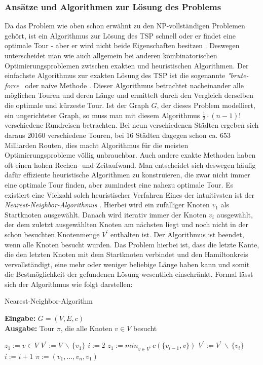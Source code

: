 \documentclass[doktyp=barbeit, sprache=german]{TUBAFarbeiten}
\begin{document}
\subsubsection{Ansätze und Algorithmen zur Lösung des Problems}
Da das Problem wie oben schon erwähnt zu den NP-vollständigen Problemen gehört, ist ein Algorithmus zur Lösung des TSP schnell oder er findet eine optimale Tour - aber er wird nicht beide Eigenschaften besitzen \cite{TSP}. Deswegen unterscheidet man wie auch allgemein bei anderen kombinatorischen Optimierungsproblemen zwischen exakten und heuristischen Algorithmen.
Der einfachste Algorithmus zur exakten Lösung des TSP ist die sogenannte \textit{"brute-force\grqq} \, oder naive Methode \cite{TaschenbuchAlgorithmen}. Dieser Algorithmus betrachtet nacheinander alle möglichen Touren und deren Länge und ermittelt durch den Vergleich derselben die optimale und kürzeste Tour. 
Ist der Graph \(G\), der dieses Problem modelliert, ein ungerichteter Graph, so muss man mit diesem Algorithmus \(\frac{1}{2} \cdot (n - 1)!\) verschiedene Rundreisen betrachten. Bei neun verschiedenen Städten ergeben sich daraus 20160 verschiedene Touren, bei 16 Städten dagegen schon ca. 653 Milliarden Routen, dies macht Algorithmus für die meisten Optimierungsprobleme völlig unbrauchbar. Auch andere exakte Methoden haben oft einen hohen Rechen- und Zeitaufwand. Man entscheidet sich deswegen häufig dafür effiziente heuristische Algorithmen zu konstruieren, die zwar nicht immer eine optimale Tour finden, aber zumindest eine nahezu optimale Tour. Es existiert eine Vielzahl solch heuristischer Verfahren Eines der intuitivsten ist der \textit{Nearest-Neighbor-Algorithmus} \cite{Lotz2014}. Hierbei wird ein zufälliger Knoten $v_1$ als Startknoten ausgewählt. Danach wird iterativ immer der Knoten $v_i$ ausgewählt, der dem zuletzt ausgewählten Knoten am nächsten liegt und noch nicht in der schon besuchten Knotenmenge $V^\prime$ enthalten ist. Der Algorithmus ist beendet, wenn alle Knoten besucht wurden. Das Problem hierbei ist, dass die letzte Kante, die den letzten Knoten mit dem Startknoten verbindet und den Hamiltonkreis vervollständigt, eine mehr oder weniger beliebige Länge haben kann und somit die Bestmöglichkeit der gefundenen Lösung wesentlich einschränkt. Formal lässt sich der Algorithmus wie folgt darstellen: 
\begin{algorithm}
\caption{Nearest-Neighbor-Algorithm}
\label{euclid}
\textbf{Eingabe:} $G = (V,E,c)$
\\\textbf{Ausgabe:} Tour $\pi$, die alle Knoten $v \in V$ besucht
\begin{algorithmic}[1]
\State $z_1 := v \in V$
\State $V^\prime := V \, \backslash \, \{v_1\}$
\State $i := 2$
\State $z_1 := min_{v\in V^\prime}  \, c(\{v_{i-1},v\})$
\State $V^\prime := V^\prime \, \backslash \, \{v_i\}$
\State $i := i +1 $
\EndWhile
\State $\pi := (v_1,...,v_n,v_1)$
\end{algorithmic}
\end{algorithm}
\end{document}
